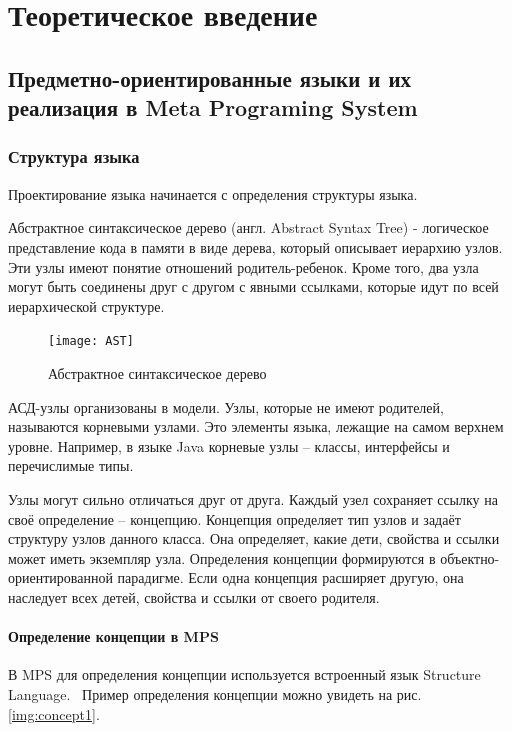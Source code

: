 \chapter{Теоретическое введение}
	
	
	
	\section{Предметно-ориентированные языки и их реализация в Meta Programing System}
		\subsection{Структура языка}

		Проектирование языка начинается с определения структуры языка.~\cite{mpssource}
		
		Абстрактное синтаксическое дерево (англ. Abstract Syntax Tree) - логическое представление кода в памяти в виде дерева, который описывает иерархию узлов. Эти узлы имеют понятие отношений родитель-ребенок. Кроме того, два узла могут быть соединены друг с другом с явными ссылками, которые идут по всей иерархической структуре.
		
		\begin{figure}[ht] 
			\centering
			\texttt{[image: AST]}
			\caption{Абстрактное синтаксическое дерево} 
			\label{img:AST}  
		\end{figure}
	
		АСД-узлы организованы в модели. Узлы, которые не имеют родителей, называются корневыми узлами. Это элементы языка, лежащие на самом верхнем уровне. Например, в языке Java корневые узлы -- классы, интерфейсы и перечислимые типы.
		
		Узлы могут сильно отличаться друг от друга. Каждый узел сохраняет ссылку на своё определение -- концепцию. Концепция определяет тип узлов и задаёт структуру узлов данного класса. Она определяет, какие дети, свойства и ссылки может иметь экземпляр узла. Определения концепции формируются в объектно-ориентированной парадигме. Если одна концепция расширяет другую, она наследует всех детей, свойства и ссылки от своего родителя.
		
		\subsubsection{Определение концепции в MPS}
		
			В MPS для определения концепции используется встроенный язык Structure Language.~\cite{mpssource} Пример определения концепции можно увидеть на рис. \ref{img:concept1}.
			
